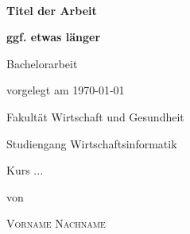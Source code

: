 \newcommand{\typMeinerArbeit}{Bachelorarbeit}

\newcommand{\themaMeinerArbeit}{Mein Titel}

\newcommand{\meinName}{Vorname Nachname}

\thispagestyle{empty}

\begin{spacing}{1}
  \begin{center}
    ~\vspace{0mm}

    {\sffamily
      \LARGE
      \textbf{Titel der Arbeit}

      \bigskip
      \textbf{ggf. etwas länger}
    }


    \vspace{15mm}

    {\Large \typMeinerArbeit}

    \vspace{1cm}

    vorgelegt am \today

    \vspace{15mm}

    Fakultät Wirtschaft und Gesundheit
    \medskip

    Studiengang Wirtschaftsinformatik
    \medskip

    Kurs ...

    \vspace{10mm}

    von

    \vspace{10mm}

    {\large\textsc{\meinName}}

    \vspace{10mm}
  \end{center}

  \vfill


\end{spacing}
